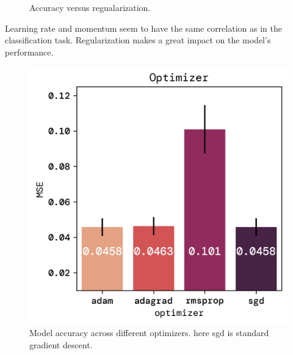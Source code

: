 \documentclass[twoside,11pt]{report}
\begin{document}
\begin{figure}[!ht]
\begin{minipage}[t]{0.5\textwidth - 1mm}
\begin{center}
            \end{center}
            \caption
            {
                Accuracy versus regualarization.
            }\label{fig:MSE_aplha}
        \end{minipage}
    \end{figure}

    \noindent
    Learning rate and momentum seem to have the same correlation as in the classification task.
    Regularization makes a great impact on the model's performance. 
    
    \begin{figure}[!ht]
        \begin{minipage}[t]{0.5\textwidth - 1mm}
            \begin{center}
                \includegraphics[width=\textwidth]{../runsAndFigures/MSE_optimizer.png}
            \end{center}
            \caption
            {
                Model accuracy across different optimizers. here sgd is standard gradient descent.
            }\label{fig:MSE_optimizer}
        \end{minipage}
        \hspace{2mm}
        \begin{minipage}[t]{0.5\textwidth - 1mm}
            \begin{center}

\end{center}
\end{minipage}
\end{figure}
\end{document}
